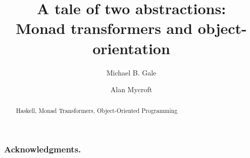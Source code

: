\documentclass[runningheads,a4paper]{llncs}
\newcommand{\keywords}[1]{\par\addvspace\baselineskip
\noindent\keywordname\enspace\ignorespaces#1}
\begin{document}
\mainmatter  %

\title{A tale of two abstractions:\\Monad transformers and object-orientation}



%
%
\author{Michael B. Gale \and Alan Mycroft}
%


%
%

\maketitle


\begin{abstract}
 

\keywords{Haskell, Monad Transformers, Object-Oriented Programming}
\end{abstract}



\subsubsection*{Acknowledgments.} 



\end{document}
